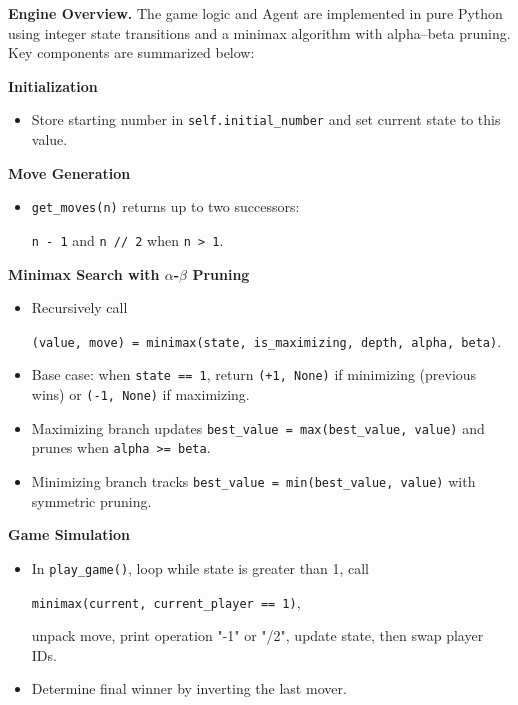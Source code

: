 \documentclass[12pt]{article}
\begin{document}
\textbf{Engine Overview.}  
The game logic and Agent are implemented in pure Python using integer state transitions and a minimax algorithm with alpha–beta pruning. Key components are summarized below:

\vspace{1em}

\noindent\textbf{Initialization}
\begin{itemize}
  \item Store starting number in \texttt{self.initial\_number} and set current state to this value.
\end{itemize}

\noindent\textbf{Move Generation}
\begin{itemize}
  \item \texttt{get\_moves(n)} returns up to two successors: 
  \begin{center}
      \texttt{n - 1} and \texttt{n // 2} when \texttt{n > 1}.
  \end{center}
\end{itemize}

\noindent\textbf{Minimax Search with \(\alpha\)-\(\beta\) Pruning}
\begin{itemize}
  \item Recursively call
    \begin{center}
        \texttt{(value, move) = minimax(state, is\_maximizing, depth, alpha, beta)}.
    \end{center}
  \item Base case: when \texttt{state == 1}, return \texttt{(+1, None)} if minimizing (previous wins) or \texttt{(-1, None)} if maximizing.
  \item Maximizing branch updates \texttt{best\_value = max(best\_value, value)} and prunes when \texttt{alpha >= beta}.
  \item Minimizing branch tracks \texttt{best\_value = min(best\_value, value)} with symmetric pruning.
\end{itemize}

\noindent\textbf{Game Simulation}
\begin{itemize}
  \item In \texttt{play\_game()}, loop while state is greater than 1, call
  \begin{center}
      \texttt{minimax(current, current\_player == 1)},
  \end{center} unpack move, print operation "-1" or "/2", update state, then swap player IDs.
  \item Determine final winner by inverting the last mover.
\end{itemize}
\end{document}
